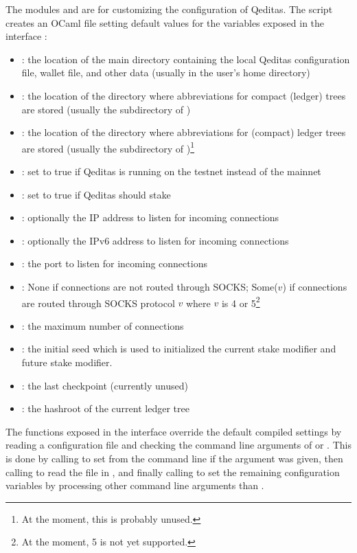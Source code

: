 The modules  and 
are for customizing the configuration of Qeditas.
The  script creates an OCaml file 
setting default values for the variables exposed in the interface :
\begin{itemize}
\item {} : the location of the main directory containing the local Qeditas configuration file, wallet file, and other data (usually  in the user's home directory)
\item {} : the location of the directory where abbreviations for compact (ledger) trees are stored (usually the  subdirectory of )
\item {} : the location of the directory where abbreviations for (compact) ledger trees are stored (usually the  subdirectory of )\footnote{At the moment, this is probably unused.}
\item {} : set to true if Qeditas is running on the testnet instead of the mainnet
\item {} : set to true if Qeditas should stake
\item {} : optionally the IP address to listen for incoming connections
\item {} : optionally the IPv6 address to listen for incoming connections
\item {} : the port to listen for incoming connections
\item {} : None if connections are not routed through SOCKS; Some($v$) if connections are routed through SOCKS protocol $v$ where $v$ is 4 or 5\footnote{At the moment, 5 is not yet supported.}
\item {} : the maximum number of connections
\item {} : the initial seed which is used to initialized the current stake modifier and future stake modifier.
\item {} : the last checkpoint (currently unused)
\item {} : the hashroot of the current ledger tree
\end{itemize}

The functions exposed in the interface 
override the default compiled settings by reading a configuration file
and checking the command line arguments of  or .
This is done by calling 
to set  from the command line if the argument  was given,
then calling  to read the  file in ,
and finally calling  to set the remaining configuration variables
by processing other command line arguments than .

